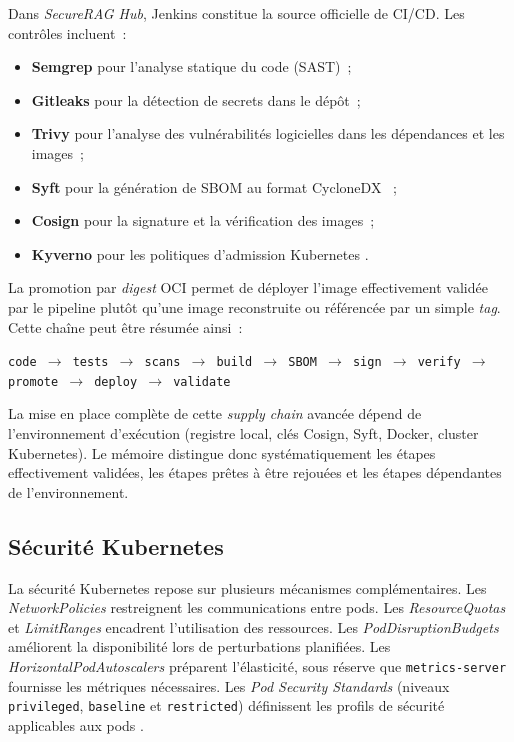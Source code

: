 Dans \textit{SecureRAG Hub}, Jenkins constitue la source officielle de CI/CD. Les contrôles incluent~:
\begin{itemize}
    \item \textbf{Semgrep} pour l'analyse statique du code (SAST)~;
    \item \textbf{Gitleaks} pour la détection de secrets dans le dépôt~;
    \item \textbf{Trivy} pour l'analyse des vulnérabilités logicielles dans les dépendances et les images~;
    \item \textbf{Syft} pour la génération de SBOM au format CycloneDX \cite{cyclonedx_spec}~;
    \item \textbf{Cosign} pour la signature et la vérification des images~;
    \item \textbf{Kyverno} pour les politiques d'admission Kubernetes \cite{kyverno_docs}.
\end{itemize}

La promotion par \textit{digest} OCI permet de déployer l'image effectivement validée par le pipeline plutôt qu'une image reconstruite ou référencée par un simple \textit{tag}. Cette chaîne peut être résumée ainsi~:

\begin{center}
\texttt{code $\rightarrow$ tests $\rightarrow$ scans $\rightarrow$ build $\rightarrow$ SBOM $\rightarrow$ sign $\rightarrow$ verify $\rightarrow$ promote $\rightarrow$ deploy $\rightarrow$ validate}
\end{center}

La mise en place complète de cette \textit{supply chain} avancée dépend de l'environnement d'exécution (registre local, clés Cosign, Syft, Docker, cluster Kubernetes). Le mémoire distingue donc systématiquement les étapes effectivement validées, les étapes prêtes à être rejouées et les étapes dépendantes de l'environnement.

\subsection{Sécurité Kubernetes}

La sécurité Kubernetes repose sur plusieurs mécanismes complémentaires. Les \textit{NetworkPolicies} restreignent les communications entre pods. Les \textit{ResourceQuotas} et \textit{LimitRanges} encadrent l'utilisation des ressources. Les \textit{PodDisruptionBudgets} améliorent la disponibilité lors de perturbations planifiées. Les \textit{HorizontalPodAutoscalers} préparent l'élasticité, sous réserve que \texttt{metrics-server} fournisse les métriques nécessaires. Les \textit{Pod Security Standards} (niveaux \texttt{privileged}, \texttt{baseline} et \texttt{restricted}) définissent les profils de sécurité applicables aux pods \cite{k8s_pod_security_standards}.

